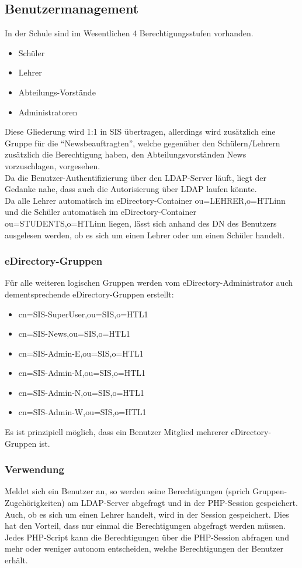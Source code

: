 \subsection{Benutzermanagement}
In der Schule sind im Wesentlichen 4 Berechtigungsstufen vorhanden.
\begin{itemize}
	\item Schüler
	\item Lehrer
	\item Abteilungs-Vorstände
	\item Administratoren
\end{itemize}
Diese Gliederung wird 1:1 in SIS übertragen, allerdings wird zusätzlich eine Gruppe für die \enquote{Newsbeauftragten}, welche gegenüber den Schülern/Lehrern zusätzlich die Berechtigung haben, den Abteilungsvorständen News vorzuschlagen, vorgesehen.\\
Da die Benutzer-Authentifizierung über den LDAP-Server läuft, liegt der Gedanke nahe, dass auch die Autorisierung über LDAP laufen könnte.\\
Da alle Lehrer automatisch im eDirectory-Container ou=LEHRER,o=HTLinn und die Schüler automatisch im eDirectory-Container ou=STUDENTS,o=HTLinn liegen, lässt sich anhand des DN des Benutzers ausgelesen werden, ob es sich um einen Lehrer oder um einen Schüler handelt.\\
\subsubsection{eDirectory-Gruppen}
Für alle weiteren logischen Gruppen werden vom eDirectory-Administrator auch dementsprechende eDirectory-Gruppen erstellt:
\begin{itemize}
	\item cn=SIS-SuperUser,ou=SIS,o=HTL1
	\item cn=SIS-News,ou=SIS,o=HTL1
	\item cn=SIS-Admin-E,ou=SIS,o=HTL1
	\item cn=SIS-Admin-M,ou=SIS,o=HTL1
	\item cn=SIS-Admin-N,ou=SIS,o=HTL1
	\item cn=SIS-Admin-W,ou=SIS,o=HTL1
\end{itemize}
Es ist prinzipiell möglich, dass ein Benutzer Mitglied mehrerer eDirectory-Gruppen ist.\\
\subsubsection{Verwendung}
Meldet sich ein Benutzer an, so werden seine Berechtigungen (sprich Gruppen-Zugehörigkeiten) am LDAP-Server abgefragt und in der PHP-Session gespeichert. Auch, ob es sich um einen Lehrer handelt, wird in der Session gespeichert. Dies hat den Vorteil, dass nur einmal die Berechtigungen abgefragt werden müssen.\\
Jedes PHP-Script kann die Berechtigungen über die PHP-Session abfragen und mehr oder weniger autonom entscheiden, welche Berechtigungen der Benutzer erhält.